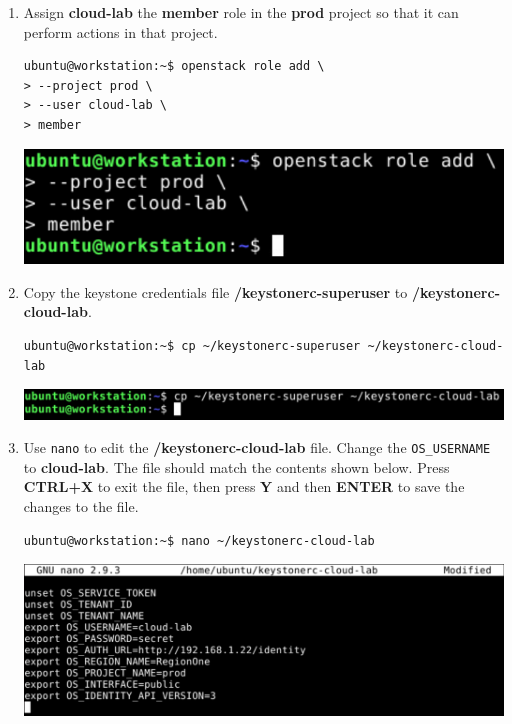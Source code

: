 \documentclass[letterpaper, 12pt]{article}
\begin{document}
\begin{enumerate}
    \item Assign \textbf{cloud-lab} the \textbf{member} role in the \textbf{prod} project so that it can perform actions
    in that project.
\begin{lstlisting}
ubuntu@workstation:~$ openstack role add \
> --project prod \
> --user cloud-lab \
> member
\end{lstlisting}

    \begin{center}
        \includegraphics[width=\linewidth]{images/part1/step9.png}
    \end{center}

    \item Copy the keystone credentials file \textbf{\texttildemid/keystonerc-superuser} to
    \textbf{\texttildemid/keystonerc-cloud-lab}.
\begin{lstlisting}
ubuntu@workstation:~$ cp ~/keystonerc-superuser ~/keystonerc-cloud-lab
\end{lstlisting}

    \begin{center}
        \includegraphics[width=\linewidth]{images/part1/step10.png}
    \end{center}

    \item Use \texttt{nano} to edit the \textbf{\texttildemid/keystonerc-cloud-lab} file. Change the
    \texttt{OS\_USERNAME} to \textbf{cloud-lab}. The file should match the contents shown below. Press \textbf{CTRL+X}
    to exit the file, then press \textbf{Y} and then \textbf{ENTER} to save the changes to the file.
\begin{lstlisting}
ubuntu@workstation:~$ nano ~/keystonerc-cloud-lab
\end{lstlisting}

    \begin{center}
        \includegraphics[width=\linewidth]{images/part1/step11.png}
    \end{center}


\end{enumerate}
\end{document}
